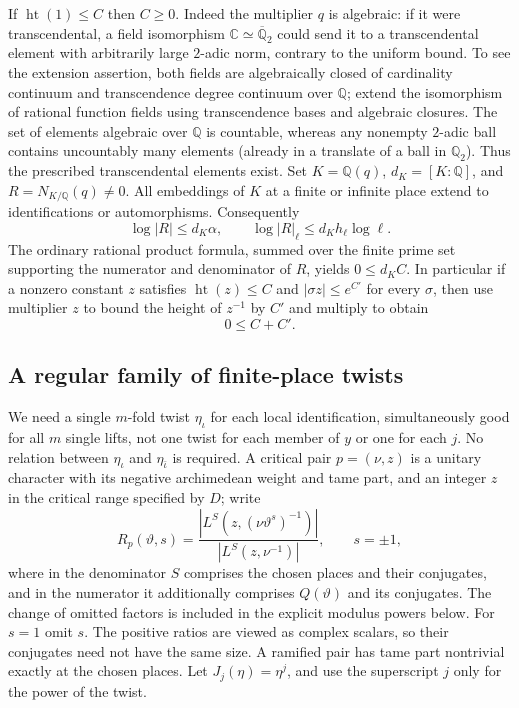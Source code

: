 If $\operatorname{ht}(1)\le C$ then $C\ge0$. Indeed the multiplier
$q$ is algebraic: if it were transcendental, a field isomorphism
$\mathbb C\simeq\overline{\mathbb Q}_2$ could send it to a
transcendental element with arbitrarily large $2$-adic norm, contrary
to the uniform bound. To see the extension assertion, both fields
are algebraically closed of cardinality continuum and transcendence
degree continuum over $\mathbb Q$; extend the isomorphism of rational
function fields using transcendence bases and algebraic closures.
The set of elements algebraic over $\mathbb Q$ is countable, whereas
any nonempty $2$-adic ball contains uncountably many elements (already
in a translate of a ball in $\mathbb Q_2$). Thus the prescribed
transcendental elements exist. Set $K=\mathbb Q(q)$, $d_K=[K:\mathbb
Q]$, and $R=N_{K/\mathbb Q}(q)\ne0$. All embeddings of $K$ at a
finite or infinite place extend to identifications or automorphisms.
Consequently
\[
 \log|R|\le d_K\alpha,\qquad
 \log|R|_\ell\le d_K h_\ell\log\ell.
\]
The ordinary rational product formula, summed over the finite prime
set supporting the numerator and denominator of $R$, yields
$0\le d_K C$. In particular if a nonzero constant $z$ satisfies
$\operatorname{ht}(z)\le C$ and $|\sigma z|\le e^{C'}$
for every $\sigma$, then use multiplier $z$ to bound the height of
$z^{-1}$ by $C'$ and multiply to obtain
\begin{equation}\label{c3:product}
 0\le C+C'.
\end{equation}

\subsection{A regular family of finite-place twists}\label{c3:twists}

We need a single $m$-fold twist $\eta_\iota$ for each local
identification, simultaneously good for all $m$ single lifts, not
one twist for each member of $y$ or one for each $j$. No relation
between $\eta_\iota$ and $\eta_{\bar\iota}$ is required.
A critical pair $p=(\nu,z)$ is a unitary character with its negative
archimedean weight and tame part, and an integer $z$ in the critical
range specified by $D$; write
\[
 R_p(\vartheta,s)=
 \frac{|L^{S}(z,(\nu\vartheta^s)^{-1})|}
 {|L^{S}(z,\nu^{-1})|},\qquad s=\pm1,
\]
where in the denominator $S$ comprises the chosen places and their
conjugates, and in the numerator it additionally comprises $Q(\vartheta)$
and its conjugates. The change of omitted factors is included in the
explicit modulus powers below. For $s=1$ omit $s$.
The positive ratios are viewed as complex scalars, so their
conjugates need not have the same size. A ramified pair has tame part
nontrivial exactly at the chosen places. Let $J_j(\eta)=\eta^j$,
and use the superscript $j$ only for the power of the twist.


